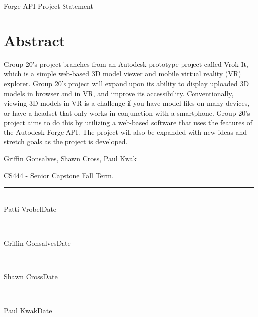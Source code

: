 \documentclass[letterpaper,10pt,draftclsnofoot,onecolumn, titlepage]{IEEEtran}
\begin{document}
\begin{titlepage}
\centering
{\huge Forge API Project Statement\par}
\vfill

\section{Abstract}
{Group 20’s project branches from an Autodesk prototype project called Vrok-It, which is a simple web-based 3D model viewer and mobile virtual reality (VR) explorer. Group 20’s project will expand upon its ability to display uploaded 3D models in browser and in VR, and improve its accessibility. Conventionally, viewing 3D models in VR is a challenge if you have model files on many devices, or have a headset that only works in conjunction with a smartphone. Group 20’s project aims to do this by utilizing a web-based software that uses the features of the Autodesk Forge API. The project will also be expanded with new ideas and stretch goals as the project is developed. \par}{\vspace{10mm}}

{\LARGE Griffin Gonsalves, Shawn Cross, Paul Kwak\par}

{\vspace{2mm}}
{\large CS444 - Senior Capstone Fall Term. \par}
\end{titlepage}






\newpage
\null
\vfill

\begin{flushleft}


	\begin{Form}
		\rule{5in}{.4mm}\\
			Patti Vrobel\hspace{60ex}Date
	\end{Form}
		
	\vspace{1cm}	
	
	\rule{5in}{.4mm}\\
	Griffin Gonsalves\hspace{55ex}Date
		
	\vspace{1cm}	
	
	\rule{5in}{.4mm}\\
	Shawn Cross\hspace{59ex}Date
	
	\vspace{1cm}	
	
	\rule{5in}{.4mm}\\
	Paul Kwak\hspace{61ex}Date

\end{flushleft}
%
%
\end{document}
